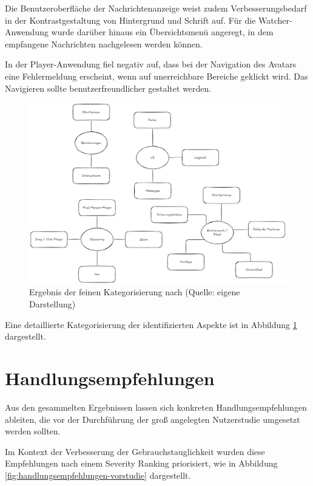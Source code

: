 Die Benutzeroberfläche der Nachrichtenanzeige weist zudem Verbesserungsbedarf in der Kontrastgestaltung von Hintergrund und Schrift auf. Für die Watcher-Anwendung wurde darüber hinaus ein Übersichtsmenü angeregt, in dem empfangene Nachrichten nachgelesen werden können.

In der Player-Anwendung fiel negativ auf, dass bei der Navigation des Avatars eine Fehlermeldung erscheint, wenn auf unerreichbare Bereiche geklickt wird. Das Navigieren sollte benutzerfreundlicher gestaltet werden.

\begin{figure}[ht]
\centering
\includegraphics[width=1\linewidth]{content/pictures/Prestudy-Qualitative-Auswertung-Schritt-2.png}
\caption{Ergebnis der feinen Kategorisierung nach \cite{braun_using_2006} (Quelle: eigene Darstellung)}
\label{fig:pre-study-qualitative-findings_2}
\end{figure}

Eine detaillierte Kategorisierung der identifizierten Aspekte ist in Abbildung \ref{fig:pre-study-qualitative-findings_2} dargestellt.

\section{Handlungsempfehlungen}

Aus den gesammelten Ergebnissen lassen sich konkreten Handlungsempfehlungen ableiten, die vor der Durchführung der groß angelegten Nutzerstudie umgesetzt werden sollten.

Im Kontext der Verbesserung der Gebrauchstauglichkeit wurden diese Empfehlungen nach einem Severity Ranking priorisiert, wie in Abbildung \ref{fig:handlungsempfehlungen-vorstudie} dargestellt.

